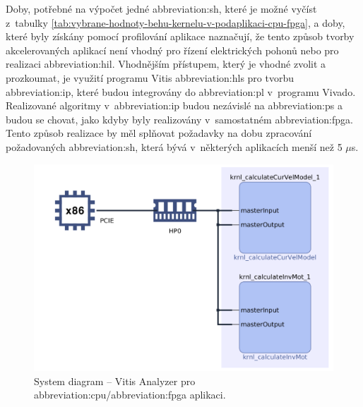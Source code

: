 \documentclass[a4paper, twoside, 11pt]{article}
\begin{document}
		Doby, potřebné na výpočet jedné \gls{abbreviation:sh}, které je možné vyčíst z~tabulky \ref{tab:vybrane-hodnoty-behu-kernelu-v-podaplikaci-cpu-fpga}, a doby, které byly získány pomocí profilování aplikace naznačují, že tento způsob tvorby akcelerovaných aplikací není vhodný pro řízení elektrických pohonů nebo pro realizaci \gls{abbreviation:hil}. Vhodnějším přístupem, který je vhodné zvolit a prozkoumat, je využití programu Vitis \gls{abbreviation:hls} pro tvorbu \gls{abbreviation:ip}, které budou integrovány do \gls{abbreviation:pl} v~programu Vivado. Realizované algoritmy v~\gls{abbreviation:ip} budou nezávislé na \gls{abbreviation:ps} a budou se chovat, jako kdyby byly realizovány v~samostatném \gls{abbreviation:fpga}. Tento způsob realizace by měl splňovat požadavky na dobu zpracování požadovaných \gls{abbreviation:sh}, která bývá v~některých aplikacích menší než 5 $\mu$s.


		

	\begin{figure}[htbp!]
		\centering
		\includegraphics[width=1\textwidth]{src/png/vitis-analyzer/rt/keyboard-input-10-values-loop/writing-data-output/rt-system-diagram-crop.png}
		\caption{System diagram – Vitis Analyzer pro \gls{abbreviation:cpu}/\gls{abbreviation:fpga} aplikaci.}
		\label{fig:rt-system-diagram-crop}
	\end{figure}
\end{document}
